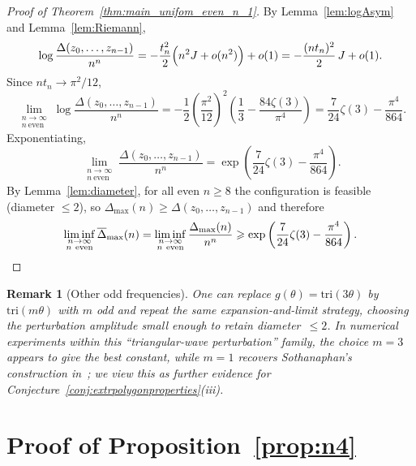 \documentclass{article}
\newtheorem{rem}[thr]{Remark}
\theoremstyle{definition}
\let\le\leqslant
\let\ge\geqslant
\newcommand*{\oD}{\overline \Delta}
\begin{document}
\begin{proof}[Proof of Theorem~\ref{thm:main_unifom_even_n_1}]
By Lemma~\ref{lem:logAsym} and Lemma~\ref{lem:Riemann},
\[
\log\frac{\Delta(z_0,\dots,z_{n-1})}{n^n}
=
-\frac{t_n^2}{2}\Bigl(n^2J+o(n^2)\Bigr)+o(1)
=
-\frac{(nt_n)^2}{2}\,J+o(1).
\]
Since $nt_n\to \pi^2/12$,
\[
\lim_{\substack{n\to\infty\\ n\ \mathrm{even}}}
\log\frac{\Delta(z_0,\dots,z_{n-1})}{n^n}
=
-\frac12\left(\frac{\pi^2}{12}\right)^2\left(\frac13-\frac{84\zeta(3)}{\pi^4}\right)
=
\frac{7}{24}\zeta(3)-\frac{\pi^4}{864}.
\]
Exponentiating,
\[
\lim_{\substack{n\to\infty\\ n\ \mathrm{even}}}
\frac{\Delta(z_0,\dots,z_{n-1})}{n^n}
=
\exp\left(\frac{7}{24}\zeta(3)-\frac{\pi^4}{864}\right).
\]
By Lemma~\ref{lem:diameter}, for all even $n\ge 8$ the configuration is feasible (diameter $\le2$),
so $\Delta_{\max}(n)\ge \Delta(z_0,\dots,z_{n-1})$ and therefore
\[
\liminf_{\substack{n\to\infty\\ n\ \mathrm{even}}}\oD_{\max}(n)
=
\liminf_{\substack{n\to\infty\\ n\ \mathrm{even}}}\frac{\Delta_{\max}(n)}{n^n}
\ge
\exp\left(\frac{7}{24}\zeta(3)-\frac{\pi^4}{864}\right).
\qedhere
\]\end{proof}

\begin{rem}[Other odd frequencies]
One can replace $g(\theta)=\mathrm{tri}(3\theta)$ by $\mathrm{tri}(m\theta)$ with $m$ odd and repeat the same
expansion-and-limit strategy, choosing the perturbation amplitude small enough to retain diameter~$\le2$.
In numerical experiments within this ``triangular-wave perturbation'' family, the choice $m=3$ appears to give the best
constant, while $m=1$ recovers Sothanaphan's construction in~\cite{Natso25}; we view this as further evidence for
Conjecture~\ref{conj:extrpolygonproperties}(iii).
\end{rem}




















\appendix




\section{Proof of Proposition~\ref{prop:n4}}\label{app:proof_n4}
\end{document}
